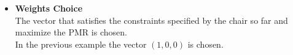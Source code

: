 \documentclass[blockverticalspace=3cm]{tikzposter}
\begin{document}
\begin{columns}
{\begin{itemize}
				\item \textbf{Weights Choice}\\
				The vector that satisfies the constraints specified by the chair so far and maximize the PMR is chosen. \\
				In the previous example the vector {\color{red}$(1,0,0)$} is chosen.
			\end{itemize}
			}
		
\end{columns}
%
%
\end{document}
